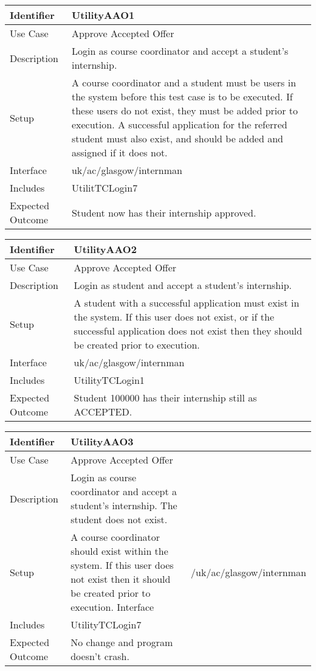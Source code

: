 \begin{tabularx}{\textwidth}{|T|L|}
\hline
Identifier & UtilityAAO1\\
\hline
Use Case & Approve Accepted Offer \\
\hline
Description & Login as course coordinator and accept a student's internship.\\
\hline
Setup & A course coordinator and a student must be users in the system
before this test case is to be executed. If these users do not exist,
they must be added prior to execution. A successful application for
the referred student must also exist, and should be added and assigned
if it does not.\\
\hline
Interface & uk/ac/glasgow/internman \\
\hline
Includes & UtilitTCLogin7 \\
\hline
Expected Outcome & Student now has their internship approved.\\
\hline
\end{tabularx}

\vspace{2em}

\begin{tabularx}{\textwidth}{|T|L|}
\hline
Identifier & UtilityAAO2\\
\hline
Use Case & Approve Accepted Offer \\
\hline
Description & Login as student and accept a student's internship.\\
\hline
Setup & A student with a successful application must exist in the
system. If this user does not exist, or if the successful application
does not exist then they should be created prior to execution. \\
\hline
Interface & uk/ac/glasgow/internman \\
\hline
Includes & UtilityTCLogin1 \\
\hline
Expected Outcome & Student 100000 has their internship still as ACCEPTED.\\
\hline
\end{tabularx}

\vspace{2em}

\begin{tabularx}{\textwidth}{|T|L|}
\hline
Identifier & UtilityAAO3\\
\hline
Use Case & Approve Accepted Offer \\
\hline
Description & Login as course coordinator and accept a student's internship.
The student does not exist.\\
\hline
Setup & A course coordinator should exist within the system. If this
user does not exist then it should be created prior to execution.
\hline
Interface & /uk/ac/glasgow/internman \\
\hline
Includes & UtilityTCLogin7 \\
\hline
Expected Outcome & No change and program doesn't crash.\\
\hline
\end{tabularx}

